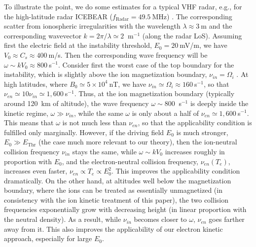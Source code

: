 \documentclass[draft]{agujournal2019}
\begin{document}
{To illustrate the point, we do some estimates for a typical VHF radar,
e.g., for the high-latitude radar ICEBEAR ($f_{\mathrm{Radar}}=49.5~$MHz)
\cite{St-Maurice:Narrow23,Ivarsen:Turbulence24}. The corresponding
scatter from ionospheric irregularities with the wavelength $\lambda
\approx3\ $m and the corresponding wavevector $k=2\pi/\lambda\simeq2\ $%
m$^{-1}$ (along the radar LoS). Assuming first the electric field at the
instability threshold, $E_{0}=20~$mV/m, we have $V_{0}\approx C_{s}%
\approx400\ $m/s. Then the corresponding wave frequency will be $\omega\sim
kV_{0}\approx800\ $s$^{-1}$. Consider first the worst case of the top boundary for the
instability, which is slightly above the ion magnetization boundary, $\nu
_{in}=\Omega_{i}$ \cite{Dimant:Ion_thermal04}. At high latitudes, where
$B_{0}\simeq5\times10^{4}\ $nT, we have $\nu_{in}\simeq\Omega_{i}\approx
160~$s$^{-1}$, so that $\nu_{en}\simeq10\nu_{in}\simeq1,600~$s$^{-1}$. Thus,
at the ion magnetization boundary (typically around 120~km of altitude), the wave frequency $\omega\sim800\ $%
s$^{-1}$ is deeply inside the kinetic regime, $\omega\gg\nu_{in}$, while the same $\omega$ is
only about a half of $\nu_{en}\simeq1,600~$s$^{-1}$. This means that $\omega$
is not much less than $\nu_{en}$, so that the applicability condition is fulfilled only
marginally. However, if the driving field $E_{0}$ is much stronger, $E_{0}\gg
E_{\mathrm{Thr}}$ (the case much more relevant to our theory), then the ion-neutral
collision frequency $\nu_{in}$ stays the same, while $\omega\sim kV_{0}$
increases roughly in proportion with $E_{0}$, and the electron-neutral
collision frequency, $\nu_{en}(T_{e})$, increases even faster, $\nu
_{en}\propto T_{e}\propto E_{0}^{2}$. This improves the
applicability condition dramatically. On the other hand, at altitudes well below the
magnetization boundary, where the ions can be treated as essentially
unmagnetized (in consistency with the ion kinetic treatment of this paper),
the two collision frequencies exponentially grow with decreasing height (in
linear proportion with the neutral density). As a result, while $\nu_{in}$ becomes
closer to $\omega$, $\nu_{en}$ goes farther away from it. This also improves the
applicability of our electron kinetic approach, especially for large $E_0$.

}
\end{document}
